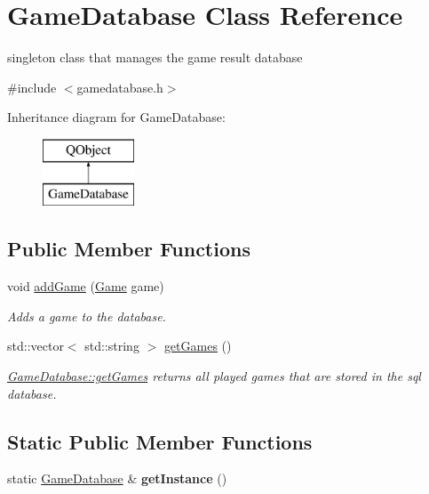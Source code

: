 \hypertarget{class_game_database}{\section{Game\-Database Class Reference}
\label{class_game_database}
}


singleton class that manages the game result database  




{\ttfamily \#include $<$gamedatabase.\-h$>$}

Inheritance diagram for Game\-Database\-:\begin{figure}[H]
\begin{center}
\leavevmode
\includegraphics[height=2.000000cm]{class_game_database}
\end{center}
\end{figure}
\subsection*{Public Member Functions}
\begin{DoxyCompactItemize}
\item 
void \hyperlink{class_game_database_aa2e298187a235ff09b53444b65ef806c}{add\-Game} (\hyperlink{struct_game}{Game} game)
\begin{DoxyCompactList}\small\item\em Adds a game to the database. \end{DoxyCompactList}\item 
std\-::vector$<$ std\-::string $>$ \hyperlink{class_game_database_acbcc841f220b5865046d19f8b0e814ed}{get\-Games} ()
\begin{DoxyCompactList}\small\item\em \hyperlink{class_game_database_acbcc841f220b5865046d19f8b0e814ed}{Game\-Database\-::get\-Games} returns all played games that are stored in the sql database. \end{DoxyCompactList}\end{DoxyCompactItemize}
\subsection*{Static Public Member Functions}
\begin{DoxyCompactItemize}
\item 
\hypertarget{class_game_database_a216477b314b74b86d42c943b359ac33a}{static \hyperlink{class_game_database}{Game\-Database} \& {\bfseries get\-Instance} ()}\label{class_game_database_a216477b314b74b86d42c943b359ac33a}

\end{DoxyCompactItemize}


